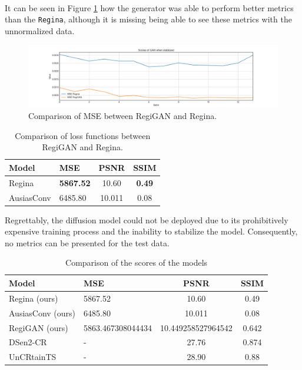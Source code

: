 \\
It  can be seen in Figure \ref{fig:models-gan.mse} how the generator was able to perform better metrics than the \texttt{Regina}, although it is missing being able to see these metrics with the unnormalized data.
\begin{figure}[H]
	\centering
	\includegraphics[width=16cm]{imgs/models/models/cnn/gan-mse.png}
	\caption{Comparison of MSE between RegiGAN and Regina.}
	\label{fig:models-gan.mse}
\end{figure}
\begin{table}[H]
	\caption{Comparison of loss functions between RegiGAN and Regina.}
	\centering
	\begin{tabular}{llcc}
		Model      & MSE              &  PSNR  &     SSIM      \\ \hline
		Regina     & \textbf{5867.52} & 10.60  & \textbf{0.49} \\
		AusiasConv & 6485.80          & 10.011 &     0.08
	\end{tabular}
	\label{tab:models-l1}
\end{table}
Regrettably, the diffusion model could not be deployed due to its prohibitively expensive training process and the inability to stabilize the model. Consequently, no metrics can be presented for the test data.
\begin{table}[H]
	\caption{Comparison of the scores of the models}
	\centering
	\begin{tabular}{llcc}
		Model                & MSE               &        PSNR        & SSIM  \\ \hline
		Regina    (ours)     & 5867.52           &       10.60        & 0.49  \\
		AusiasConv    (ours) & 6485.80           &       10.011       & 0.08  \\
		RegiGAN     (ours)   & 5863.467308044434 & 10.449258527964542 & 0.642 \\
		DSen2-CR             & -                 &       27.76        & 0.874 \\
		UnCRtainTS           & -                 &       28.90        & 0.88
	\end{tabular}
	\label{tab:models-l1}
\end{table}
